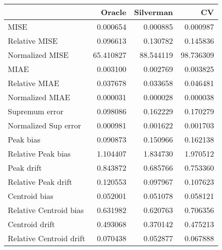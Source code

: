 \begin{tabular}{lrrr}
  \toprule
 & Oracle & Silverman & CV \\ 
  \midrule
MISE & 0.000654 & 0.000885 & 0.000987 \\ 
  Relative MISE & 0.096613 & 0.130782 & 0.145836 \\ 
  Normalized MISE & 65.410827 & 88.544119 & 98.736309 \\ 
  MIAE & 0.003100 & 0.002769 & 0.003825 \\ 
  Relative MIAE & 0.037678 & 0.033658 & 0.046481 \\ 
  Normalized MIAE & 0.000031 & 0.000028 & 0.000038 \\ 
  Supremum error & 0.098086 & 0.162229 & 0.170279 \\ 
  Normalized Sup error & 0.000981 & 0.001622 & 0.001703 \\ 
  Peak bias & 0.090873 & 0.150966 & 0.162138 \\ 
  Relative Peak bias & 1.104407 & 1.834730 & 1.970512 \\ 
  Peak drift & 0.843872 & 0.685766 & 0.753360 \\ 
  Relative Peak drift & 0.120553 & 0.097967 & 0.107623 \\ 
  Centroid bias & 0.052001 & 0.051078 & 0.058121 \\ 
  Relative Centroid bias & 0.631982 & 0.620763 & 0.706356 \\ 
  Centroid drift & 0.493068 & 0.370142 & 0.475213 \\ 
  Relative Centroid drift & 0.070438 & 0.052877 & 0.067888 \\ 
   \bottomrule
\end{tabular}
